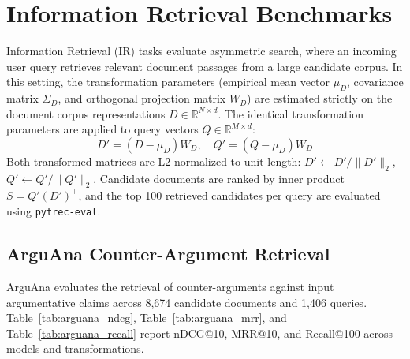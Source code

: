 \section{Information Retrieval Benchmarks}
\label{sec:retrieval_results}

Information Retrieval (IR) tasks evaluate asymmetric search, where an incoming user query retrieves relevant document passages from a large candidate corpus. In this setting, the transformation parameters (empirical mean vector $\mu_D$, covariance matrix $\Sigma_D$, and orthogonal projection matrix $W_D$) are estimated strictly on the document corpus representations $D \in \mathbb{R}^{N \times d}$. The identical transformation parameters are applied to query vectors $Q \in \mathbb{R}^{M \times d}$:
\begin{equation}
D' = (D - \mu_D) W_D, \quad Q' = (Q - \mu_D) W_D
\end{equation}
Both transformed matrices are L2-normalized to unit length: $D' \leftarrow D' / \|D'\|_2$, $Q' \leftarrow Q' / \|Q'\|_2$. Candidate documents are ranked by inner product $S = Q' (D')^\top$, and the top 100 retrieved candidates per query are evaluated using \texttt{pytrec-eval}.

\subsection{ArguAna Counter-Argument Retrieval}
ArguAna evaluates the retrieval of counter-arguments against input argumentative claims across 8,674 candidate documents and 1,406 queries. Table~\ref{tab:arguana_ndcg}, Table~\ref{tab:arguana_mrr}, and Table~\ref{tab:arguana_recall} report nDCG@10, MRR@10, and Recall@100 across models and transformations.





